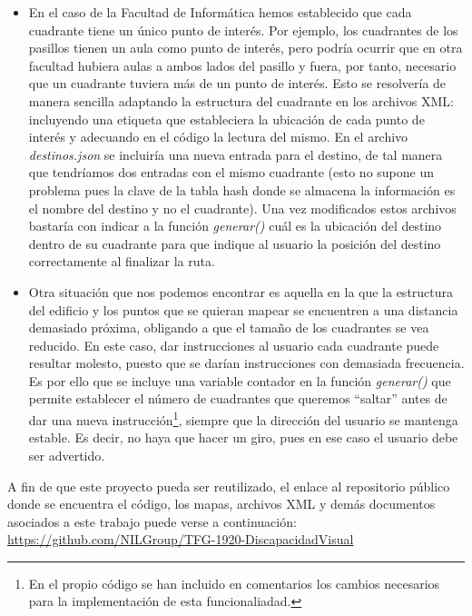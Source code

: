 \begin{itemize}

	\item En el caso de la Facultad de Informática hemos establecido que cada cuadrante tiene un único punto de interés. Por ejemplo, los cuadrantes de los pasillos tienen un aula como punto de interés, pero podría ocurrir que en otra facultad hubiera aulas a ambos lados del pasillo y fuera, por tanto, necesario que un cuadrante tuviera más de un punto de interés. Esto se resolvería de manera sencilla adaptando la estructura del cuadrante en los archivos XML: incluyendo una etiqueta que estableciera la ubicación de cada punto de interés y adecuando en el código la lectura del mismo. En el archivo \textit{destinos.json} se incluiría una nueva entrada para el destino, de tal manera que tendríamos dos entradas con el mismo cuadrante (esto no supone un problema pues la clave de la tabla hash donde se almacena la información es el nombre del destino y no el cuadrante). Una vez modificados estos archivos bastaría con indicar a la función \textit{generar()} cuál es la ubicación del destino dentro de su cuadrante para que indique al usuario la posición del destino correctamente al finalizar la ruta.
	
	\item Otra situación que nos podemos encontrar es aquella en la que la estructura del edificio y los puntos que se quieran mapear se encuentren a una distancia demasiado próxima, obligando a que el tamaño de los cuadrantes se vea reducido. En este caso, dar instrucciones al usuario cada cuadrante puede resultar molesto, puesto que se darían instrucciones con demasiada frecuencia. Es por ello que se incluye una variable contador en la función \textit{generar()} que permite establecer el número de cuadrantes que queremos ``saltar'' antes de dar una nueva instrucción\footnote{En el propio código se han incluido en comentarios los cambios necesarios para la implementación de esta funcionaliadad.}, siempre que la dirección del usuario se mantenga estable. Es decir, no haya que hacer un giro, pues en ese caso el usuario debe ser advertido. 

\end{itemize}

A fin de que este proyecto pueda ser reutilizado, el enlace al repositorio público donde se encuentra el código, los mapas, archivos XML y demás documentos asociados a este trabajo puede verse a continuación: \url{https://github.com/NILGroup/TFG-1920-DiscapacidadVisual}